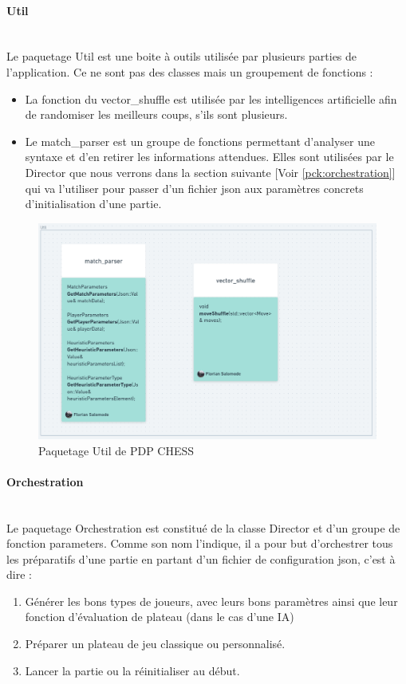\huge\documentclass{article}
\begin{document}
\paragraph{Util}
~~\\
\newline
Le paquetage Util est une boite à outils utilisée par plusieurs parties de l'application. Ce ne sont pas des classes mais un groupement de fonctions :
\begin{itemize}
    \item La fonction du vector\_shuffle est utilisée par les intelligences artificielle afin de randomiser les meilleurs coups, s'ils sont plusieurs.
    \item Le match\_parser est un groupe de fonctions permettant d'analyser une syntaxe et d'en retirer les informations attendues. Elles sont utilisées par le Director que nous verrons dans la section suivante [Voir \ref{pck:orchestration}] qui va l'utiliser pour passer d'un fichier json aux paramètres concrets d'initialisation d'une partie.
\end{itemize}
\begin{figure}[!h]
    \centering
    \includegraphics[scale = 0.3]{img/Package/Util.png}
    \caption{Paquetage Util de PDP CHESS}
    \label{pck:util}
\end{figure}
\newpage
\paragraph{Orchestration}
~~\\
\newline
Le paquetage Orchestration est constitué de la classe Director et d'un groupe de fonction parameters. Comme son nom l'indique, il a pour but d'orchestrer tous les préparatifs d'une partie en partant d'un fichier de configuration json, c'est à dire :
\begin{enumerate}
    \item Générer les bons types de joueurs, avec leurs bons paramètres ainsi que leur fonction d'évaluation de plateau (dans le cas d'une IA)
    \item Préparer un plateau de jeu classique ou personnalisé.
    \item Lancer la partie ou la réinitialiser au début.
\end{enumerate}
\end{document}
